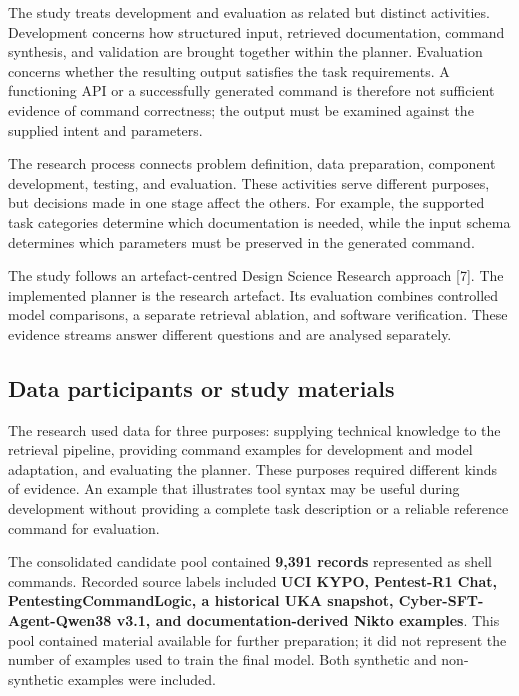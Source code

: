 \documentclass[
]{article}
\begin{document}
The study treats development and evaluation as related but distinct
activities. Development concerns how structured input, retrieved
documentation, command synthesis, and validation are brought together
within the planner. Evaluation concerns whether the resulting output
satisfies the task requirements. A functioning API or a successfully
generated command is therefore not sufficient evidence of command
correctness; the output must be examined against the supplied intent and
parameters.

The research process connects problem definition, data preparation,
component development, testing, and evaluation. These activities serve
different purposes, but decisions made in one stage affect the others.
For example, the supported task categories determine which documentation
is needed, while the input schema determines which parameters must be
preserved in the generated command.

The study follows an artefact-centred Design Science Research approach
{[}7{]}. The implemented planner is the research artefact. Its
evaluation combines controlled model comparisons, a separate retrieval
ablation, and software verification. These evidence streams answer
different questions and are analysed separately.

\hypertarget{data-participants-or-study-materials}{%
\subsection{Data participants or study
materials}\label{data-participants-or-study-materials}}

The research used data for three purposes: supplying technical knowledge
to the retrieval pipeline, providing command examples for development
and model adaptation, and evaluating the planner. These purposes
required different kinds of evidence. An example that illustrates tool
syntax may be useful during development without providing a complete
task description or a reliable reference command for evaluation.

The consolidated candidate pool contained \textbf{9,391 records}
represented as shell commands. Recorded source labels included
\textbf{UCI KYPO, Pentest-R1 Chat, PentestingCommandLogic, a historical
UKA snapshot, Cyber-SFT-Agent-Qwen38 v3.1, and documentation-derived
Nikto examples}. This pool contained material available for further
preparation; it did not represent the number of examples used to train
the final model. Both synthetic and non-synthetic examples were
included.
\end{document}
